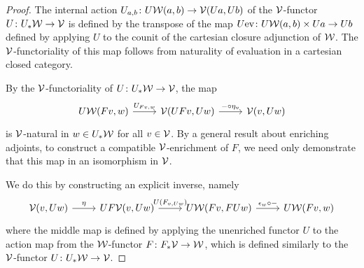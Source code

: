 \begin{proof}
The internal action $U_{a,b} \colon U{\mathord{\mathcal{W}}}(a,b) \to {\mathord{\mathcal{V}}}(Ua,Ub)$ of the ${\mathord{\mathcal{V}}}$-functor $U \colon U_*{\mathord{\mathcal{W}}} \to {\mathord{\mathcal{V}}}$ is defined by the transpose of the map $U\textup{ev} \colon U{\mathord{\mathcal{W}}}(a,b) \times Ua \to Ub$ defined by applying $U$ to the counit of the cartesian closure adjunction of ${\mathord{\mathcal{W}}}$. The ${\mathord{\mathcal{V}}}$-functoriality of this map follows from naturality of evaluation in a cartesian closed category.


By the ${\mathord{\mathcal{V}}}$-functoriality of $U \colon U_*{\mathord{\mathcal{W}}} \to {\mathord{\mathcal{V}}}$, the map
\[
\begin{tikzcd} U\cW(Fv,w) \arrow[r, "U_{Fv,w}"] & \cV(UFv,Uw) \arrow[r, "{- \circ \eta_v}"] & \cV(v,Uw)
\end{tikzcd}
\]
is ${\mathord{\mathcal{V}}}$-natural in $w \in U_*{\mathord{\mathcal{W}}}$ for all $v \in {\mathord{\mathcal{V}}}$. By a general result about enriching adjoints,  %
 to construct a compatible ${\mathord{\mathcal{V}}}$-enrichment of $F$, we need only demonstrate that this map in an isomorphism in ${\mathord{\mathcal{V}}}$.

We do this by constructing an explicit inverse, namely
\[
\begin{tikzcd}
\cV(v,Uw) \arrow[r, "\eta"] & UF\cV(v,Uw) \arrow[r, "U(F_{v,Uw})"] & U\cW(Fv,FUw) \arrow[r, "\epsilon_w \circ -"] & U\cW(Fv,w)
\end{tikzcd}
\]
where the middle map is defined by applying the unenriched functor $U$ to the action map from the ${\mathord{\mathcal{W}}}$-functor $F \colon F_*{\mathord{\mathcal{V}}} \to {\mathord{\mathcal{W}}}$, which is defined similarly to the ${\mathord{\mathcal{V}}}$-functor $U \colon U_*{\mathord{\mathcal{W}}} \to {\mathord{\mathcal{V}}}$.


\end{proof}
